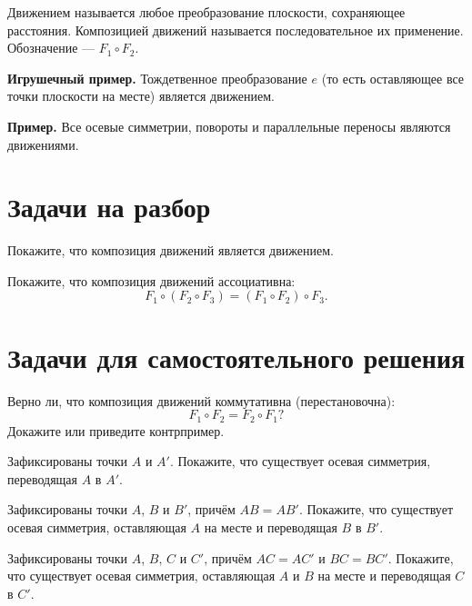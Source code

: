 \documentclass[a4paper,12pt]{article}
\begin{document}
    
\begin{define}
    Движением называется любое преобразование плоскости, сохраняющее расстояния. Композицией движений называется последовательное их применение. Обозначение --- $F_1 \circ F_2$.
    \end{define}
    
    \textbf{Игрушечный пример.} Тождетвенное преобразование $e$ (то есть оставляющее все точки плоскости на месте) является движением.
    
    \textbf{Пример.} Все осевые симметрии, повороты и параллельные переносы являются движениями.
    
    \section{Задачи на разбор}
    
    \problem Покажите, что композиция движений является движением.
    
    \problem Покажите, что композиция движений ассоциативна:
    \begin{equation*}
        F_1 \circ (F_2 \circ F_3) = (F_1 \circ F_2) \circ F_3.
    \end{equation*}
    
    \section{Задачи для самостоятельного решения}
    
    \problem Верно ли, что композиция движений коммутативна (перестановочна): 
    \begin{equation*}
        F_1 \circ F_2 = F_2 \circ F_1?
    \end{equation*}
    Докажите или приведите контрпример.
    
     Зафиксированы точки $A$ и $A'$. Покажите, что существует осевая симметрия, переводящая $A$ в $A'$.
    
     Зафиксированы точки $A$, $B$ и $B'$, причём $AB = AB'$. Покажите, что существует осевая симметрия, оставляющая $A$ на месте и переводящая $B$ в $B'$.
    
     Зафиксированы точки $A$, $B$, $C$ и $C'$, причём $AC = AC'$ и $BC = BC'$. Покажите, что существует осевая симметрия, оставляющая $A$ и $B$ на месте и переводящая $C$ в $C'$.
    
\end{document}
